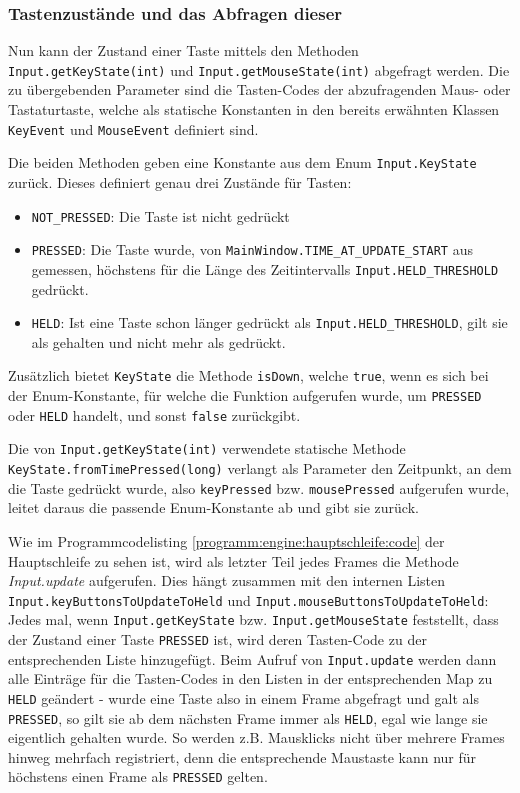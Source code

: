 \begin{sloppypar}
\subsubsection{Tastenzustände und das Abfragen dieser}

Nun kann der Zustand einer Taste mittels den Methoden
\texttt{Input.getKeyState(int)} und \texttt{Input.getMouseState(int)}
abgefragt werden. Die zu übergebenden Parameter sind die
Tasten-Codes der abzufragenden Maus- oder Tastaturtaste,
welche als statische Konstanten in den bereits erwähnten
Klassen \texttt{KeyEvent} und \texttt{MouseEvent} definiert sind.

Die beiden Methoden geben eine Konstante aus dem Enum
\texttt{Input.KeyState} zurück. Dieses definiert genau
drei Zustände für Tasten:

\begin{itemize}
	\item \texttt{NOT\_PRESSED}: Die Taste ist nicht gedrückt
	\item \texttt{PRESSED}: Die Taste wurde, von \texttt{MainWindow.TIME\_AT\_UPDATE\_START}
	      aus gemessen, höchstens für die Länge des Zeitintervalls
	      \texttt{Input.HELD\_THRESHOLD} gedrückt.
	\item \texttt{HELD}: Ist eine Taste schon länger gedrückt
	      als \texttt{Input.HELD\_THRESHOLD}, gilt sie als gehalten
	      und nicht mehr als gedrückt.
\end{itemize}

Zusätzlich bietet \texttt{KeyState} die Methode \texttt{isDown},
welche \texttt{true}, wenn es sich bei der Enum-Konstante,
für welche die Funktion aufgerufen wurde, um \texttt{PRESSED}
oder \texttt{HELD} handelt, und sonst \texttt{false} zurückgibt.

Die von \texttt{Input.getKeyState(int)} verwendete
statische Methode \texttt{KeyState.fromTimePressed(long)} verlangt
als Parameter den Zeitpunkt, an dem die Taste gedrückt wurde, also
\texttt{keyPressed} bzw. \texttt{mousePressed} aufgerufen wurde,
leitet daraus die passende Enum-Konstante ab und gibt sie zurück.

Wie im Programmcodelisting \ref{programm:engine:hauptschleife:code} der Hauptschleife
zu sehen ist, wird als letzter Teil jedes Frames die Methode
\textit{Input.update} aufgerufen. Dies hängt zusammen mit den
internen Listen \texttt{Input.keyButtonsToUpdateToHeld} und
\texttt{Input.mouseButtonsToUpdateToHeld}: Jedes mal, wenn
\texttt{Input.getKeyState} bzw. \texttt{Input.getMouseState}
feststellt, dass der Zustand einer Taste \texttt{PRESSED} ist,
wird deren Tasten-Code zu der entsprechenden Liste hinzugefügt.
Beim Aufruf von \texttt{Input.update} werden dann alle Einträge
für die Tasten-Codes in den Listen in der entsprechenden Map
zu \texttt{HELD} geändert - wurde eine Taste also in einem Frame
abgefragt und galt als \texttt{PRESSED}, so gilt sie ab dem nächsten
Frame immer als \texttt{HELD}, egal wie lange sie eigentlich gehalten
wurde. So werden z.B. Mausklicks nicht über mehrere Frames hinweg
mehrfach registriert, denn die entsprechende Maustaste kann nur
für höchstens einen Frame als \texttt{PRESSED} gelten.



\end{sloppypar}
